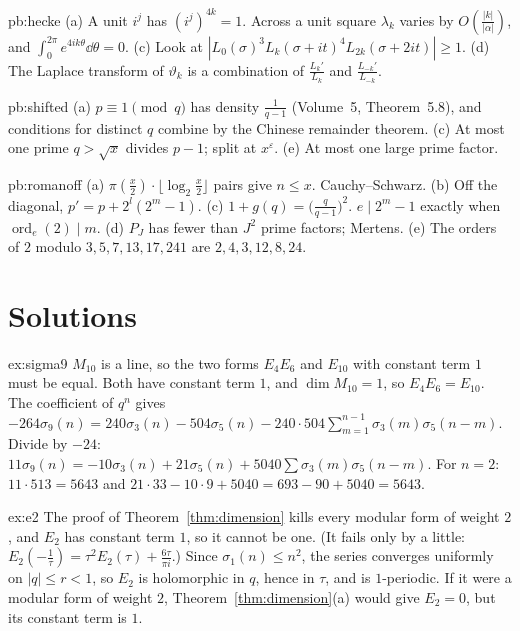 \begin{hint}{pb:hecke}
(a) A unit $i^j$ has $(i^j)^{4k}=1$. Across a unit square $\lambda_k$ varies by $O(\frac{|k|}{|\alpha|})$, and $\int_0^{2\pi}e^{4ik\theta}\dd\theta=0$. (c) Look at
$|L_0(\sigma)^3L_k(\sigma+it)^4L_{2k}(\sigma+2it)|\ge1$. (d) The Laplace transform of $\vartheta_k$ is a combination of $\frac{L_k'}{L_k}$ and $\frac{L_{-k}'}{L_{-k}}$.
\end{hint}

\begin{hint}{pb:shifted}
(a) $p\equiv1\pmod q$ has density $\frac1{q-1}$ (Volume~5, Theorem~5.8), and conditions for distinct $q$ combine by the Chinese remainder theorem. (c) At most one prime
$q>\sqrt x$ divides $p-1$; split at $x^\varepsilon$. (e) At most one large prime factor.
\end{hint}

\begin{hint}{pb:romanoff}
(a) $\pi(\frac x2)\cdot\lfloor\log_2\frac x2\rfloor$ pairs give $n\le x$. Cauchy--Schwarz. (b) Off the diagonal, $p'=p+2^l(2^m-1)$. (c) $1+g(q)=\bigl(\frac q{q-1}\bigr)^2$.
$e\mid2^m-1$ exactly when $\operatorname{ord}_e(2)\mid m$. (d) $P_J$ has fewer than $J^2$ prime factors; Mertens. (e) The orders of $2$ modulo $3,5,7,13,17,241$ are
$2,4,3,12,8,24$.
\end{hint}

\section{Solutions}

\begin{solution}{ex:sigma9}
\idea $M_{10}$ is a line, so the two forms $E_4E_6$ and $E_{10}$ with constant term $1$ must be equal.
\writeup Both have constant term $1$, and $\dim M_{10}=1$, so $E_4E_6=E_{10}$. The coefficient of $q^n$ gives
$-264\sigma_9(n)=240\sigma_3(n)-504\sigma_5(n)-240\cdot504\sum_{m=1}^{n-1}\sigma_3(m)\sigma_5(n-m)$. Divide by $-24$: $11\sigma_9(n)=-10\sigma_3(n)+21\sigma_5(n)+5040\sum\sigma_3(m)\sigma_5(n-m)$. For $n=2$: $11\cdot513=5643$ and
$21\cdot33-10\cdot9+5040=693-90+5040=5643$.
\end{solution}

\begin{solution}{ex:e2}
\idea The proof of Theorem~\ref{thm:dimension} kills every modular form of weight $2$, and $E_2$ has constant term $1$, so it cannot be one. (It fails only by a little: $E_2(-\frac1\tau)=\tau^2E_2(\tau)+\frac{6\tau}{\pi i}$.)
\writeup Since $\sigma_1(n)\le n^2$, the series converges uniformly on $|q|\le r<1$, so $E_2$ is holomorphic in $q$, hence in $\tau$, and is $1$-periodic. If it were a modular form of weight $2$, Theorem~\ref{thm:dimension}(a) would give $E_2=0$,
but its constant term is $1$.
\end{solution}

